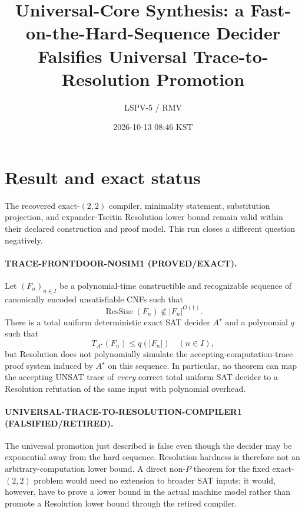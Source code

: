 \documentclass[11pt]{article}
\title{Universal-Core Synthesis: a Fast-on-the-Hard-Sequence Decider\\
Falsifies Universal Trace-to-Resolution Promotion}
\author{LSPV-5 / RMV}
\date{2026-10-13 08:46 KST}
\newcommand{\ResSize}{\operatorname{ResSize}}
\begin{document}
\maketitle

\begin{center}
\end{center}

\section{Result and exact status}

The recovered exact-$(2,2)$ compiler, minimality statement, substitution
projection, and expander-Tseitin Resolution lower bound remain valid within
their declared construction and proof model.  This run closes a different
question negatively.

\paragraph{TRACE-FRONTDOOR-NOSIM1 (PROVED/EXACT).}
Let $(F_n)_{n\in I}$ be a polynomial-time constructible and recognizable
sequence of canonically encoded unsatisfiable CNFs such that
\[
  \ResSize(F_n)\notin |F_n|^{O(1)}.
\]
There is a total uniform deterministic exact SAT decider $A^\star$ and a
polynomial $q$ such that
\[
  T_{A^\star}(F_n)\le q(|F_n|)\quad(n\in I),
\]
but Resolution does not polynomially simulate the accepting-computation-trace
proof system induced by $A^\star$ on this sequence.  In particular, no theorem
can map the accepting UNSAT trace of \emph{every} correct total uniform SAT
decider to a Resolution refutation of the same input with polynomial overhead.

\paragraph{UNIVERSAL-TRACE-TO-RESOLUTION-COMPILER1
(FALSIFIED/RETIRED).}
The universal promotion just described is false even though the decider may be
exponential away from the hard sequence.  Resolution hardness is therefore not
an arbitrary-computation lower bound.  A direct non-$P$ theorem for the fixed
exact-$(2,2)$ problem would need no extension to broader SAT inputs; it would,
however, have to prove a lower bound in the actual machine model rather than
promote a Resolution lower bound through the retired compiler.
\end{document}
